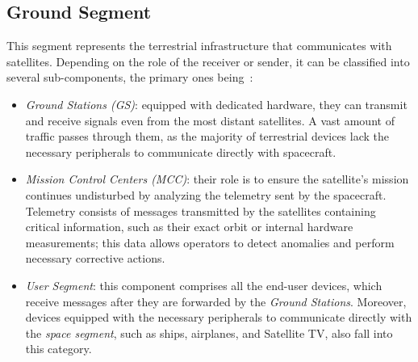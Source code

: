 \documentclass[11pt,a4paper]{report}
\begin{document}
\subsection{Ground Segment}
This segment represents the terrestrial infrastructure that communicates 
with satellites. Depending on the role of the receiver or sender, it can 
be classified into several sub-components, the primary ones being~\cite[p. 383--384]{aLotOfReferences}:
\begin{itemize}
    \item \textit{Ground Stations (GS)}: equipped with dedicated hardware, they can transmit and receive signals even from the most distant satellites. 
    A vast amount of traffic passes through them, as the majority of terrestrial devices lack the necessary peripherals to communicate directly with 
    spacecraft.
    
    \item \textit{Mission Control Centers (MCC)}: their role is to ensure the satellite's mission continues undisturbed by analyzing the telemetry 
    sent by the spacecraft. Telemetry consists of messages transmitted by the satellites containing critical information, such as their exact orbit or 
    internal hardware measurements; this data allows operators to detect anomalies and perform necessary corrective actions. 

    \item \textit{User Segment}: this component comprises all the end-user devices, which receive messages after they are forwarded by the 
    \textit{Ground Stations}. Moreover, devices equipped with the necessary peripherals to communicate directly with the \textit{space segment}, such 
    as ships, airplanes, and Satellite TV, also fall into this category. 
\end{itemize}
\end{document}
